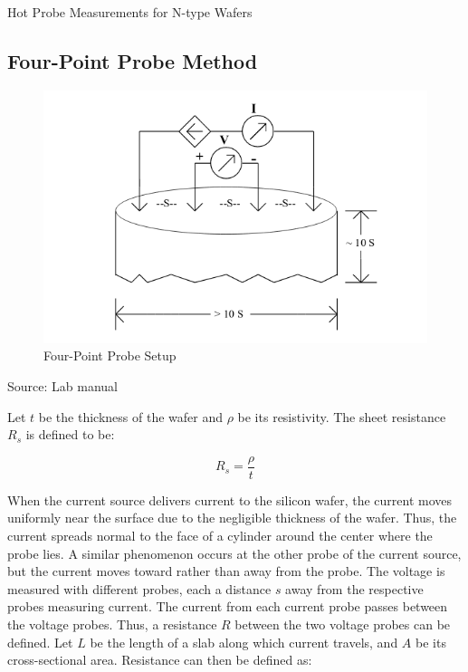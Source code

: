 \documentclass{article}
\begin{document}
	\begin{table}[h!]
		\centering
		\caption{Hot Probe Measurements for N-type Wafers}
		\label{tab:hot_probe_measurements_n_type}
	\end{table}

	\FloatBarrier
	
	\subsection{Four-Point Probe Method}

\FloatBarrier

\begin{figure}[h!]
	\centering
	\includegraphics[scale=0.5]{../images/three_pt_probe.PNG}
	\caption{Four-Point Probe Setup}
	\label{fig:four_pt_setup}
\end{figure}
{\footnotesize Source: Lab manual}

\FloatBarrier
Let $t$ be the thickness of the wafer and $\rho$ be its resistivity. The sheet resistance $R_s$ is defined to be:

\begin{equation}
\label{eq:rs_def}
R_s = \frac{ \rho }{ t }
\end{equation}

When the current source delivers current to the silicon wafer, the current moves uniformly near the surface due to the negligible thickness of the wafer. Thus, the current spreads normal to the face of a cylinder around the center where the probe lies. A similar phenomenon occurs at the other probe of the current source, but the current moves toward rather than away from the probe.
The voltage is measured with different probes, each a distance $s$ away from the respective probes measuring current. The current from each current probe passes between the voltage probes. Thus, a resistance $R$ between the two voltage probes can be defined.
Let $L$ be the length of a slab along which current travels, and $A$ be its cross-sectional area. Resistance can then be defined as:
\end{document}
